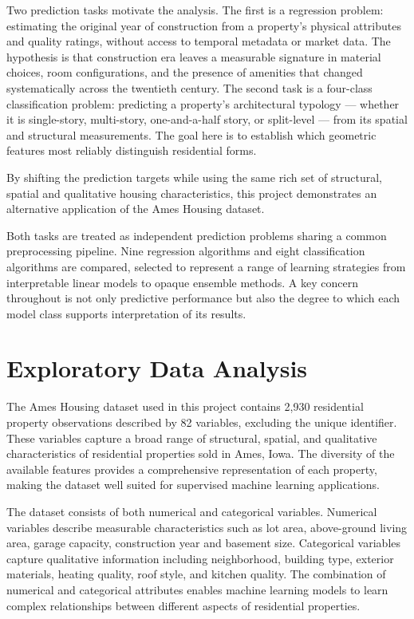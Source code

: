 \documentclass[11pt,a4paper]{article}
\let\oldsection\section
\renewcommand{\section}{\clearpage\oldsection}
\begin{document}
Two prediction tasks motivate the analysis. The first is a regression
problem: estimating the original year of construction from a property's
physical attributes and quality ratings, without access to temporal
metadata or market data. The hypothesis is that construction era leaves
a measurable signature in material choices, room configurations, and the
presence of amenities that changed systematically across the twentieth
century. The second task is a four-class classification problem:
predicting a property's architectural typology --- whether it is
single-story, multi-story, one-and-a-half story, or split-level --- from
its spatial and structural measurements. The goal here is to establish
which geometric features most reliably distinguish residential forms.

By shifting the prediction targets while using the same rich set of
structural, spatial and qualitative housing characteristics, this
project demonstrates an alternative application of the Ames Housing
dataset.

Both tasks are treated as independent prediction problems sharing a
common preprocessing pipeline. Nine regression algorithms and eight
classification algorithms are compared, selected to represent a range of
learning strategies from interpretable linear models to opaque ensemble
methods. A key concern throughout is not only predictive performance but
also the degree to which each model class supports interpretation of its
results.

\section{Exploratory Data Analysis}\label{exploratory-data-analysis}

The Ames Housing dataset used in this project contains 2,930 residential
property observations described by 82 variables, excluding the unique
identifier. These variables capture a broad range of structural,
spatial, and qualitative characteristics of residential properties sold
in Ames, Iowa. The diversity of the available features provides a
comprehensive representation of each property, making the dataset well
suited for supervised machine learning applications.

The dataset consists of both numerical and categorical variables.
Numerical variables describe measurable characteristics such as lot
area, above-ground living area, garage capacity, construction year and
basement size. Categorical variables capture qualitative information
including neighborhood, building type, exterior materials, heating
quality, roof style, and kitchen quality. The combination of numerical
and categorical attributes enables machine learning models to learn
complex relationships between different aspects of residential
properties.
\end{document}

